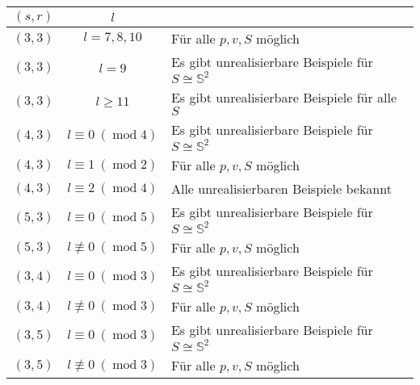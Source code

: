 \documentclass[10pt, notheorems]{beamer}
\newcommand{\sphere}{\mathbb{S}}
\renewcommand{\mod}{\operatorname{mod}}
\begin{document}
\begin{frame}
  \begin{tabularx}{\textwidth}{|c|c|X|}
    \hline
    $(s, r)$ & $l$ &\\
    \hline
    $(3, 3)$ & $l = 7, 8, 10$        & Für alle $p, v, S$ möglich\\
    $(3, 3)$ & $l = 9$               & Es gibt unrealisierbare Beispiele für $S \cong \sphere^2$\\
    $(3, 3)$ & $l \geq 11$           & Es gibt unrealisierbare Beispiele für alle $S$\\
    $(4, 3)$ & $l \equiv 0~(\mod 4)$ & Es gibt unrealisierbare Beispiele für $S \cong \sphere^2$\\
    $(4, 3)$ & $l \equiv 1~(\mod 2)$ & Für alle $p, v, S$ möglich\\
    $(4, 3)$ & $l \equiv 2~(\mod 4)$ & Alle unrealisierbaren Beispiele bekannt\\
    $(5, 3)$ & $l \equiv 0~(\mod 5)$ & Es gibt unrealisierbare Beispiele für $S \cong \sphere^2$\\
    $(5, 3)$ & $l \not\equiv 0~(\mod 5)$ & Für alle $p, v, S$ möglich\\
    $(3, 4)$ & $l \equiv 0~(\mod 3)$ & Es gibt unrealisierbare Beispiele für $S \cong \sphere^2$\\
    $(3, 4)$ & $l \not\equiv 0~(\mod 3)$ & Für alle $p, v, S$ möglich\\
    $(3, 5)$ & $l \equiv 0~(\mod 3)$ & Es gibt unrealisierbare Beispiele für $S \cong \sphere^2$\\
    $(3, 5)$ & $l \not\equiv 0~(\mod 3)$ & Für alle $p, v, S$ möglich\\
    \hline
  \end{tabularx}
\end{frame}
\end{document}
